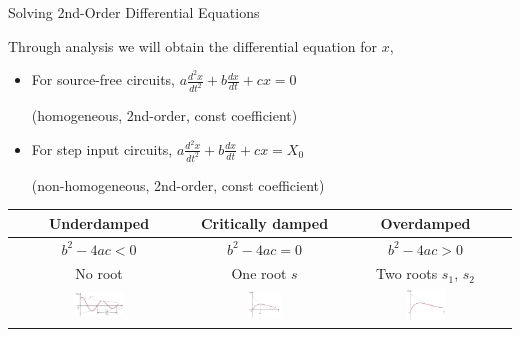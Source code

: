 \documentclass{beamer}
\begin{document}

\begin{frame}{Solving 2nd-Order Differential Equations}

Through analysis we will obtain the differential equation for $x$, 
\begin{itemize}
    \item For source-free circuits, $a\frac{d^2x}{dt^2}+b\frac{dx}{dt}+cx=0$

    (homogeneous, 2nd-order, const coefficient)
    \item For step input circuits, $a\frac{d^2x}{dt^2}+b\frac{dx}{dt}+cx=X_0$

    (non-homogeneous, 2nd-order, const coefficient)
\end{itemize}

\begin{table}[]
    \centering
    \begin{small}
           
    \begin{tabular}{ccc}
        \toprule
        Underdamped & Critically damped & Overdamped\\
        \midrule
        $b^2-4ac < 0$& $b^2-4ac=0$ & $b^2-4ac>0$ \\ 
        No root & One root $s$ & Two roots $s_1$, $s_2$ \\
        \includegraphics[width=0.3\textwidth]{img_2order/3_underdamped.png}
        &
        \includegraphics[width=0.25\textwidth]{img_2order/2_criticallydamped.png}
        &
        \includegraphics[width=0.25\textwidth]{img_2order/1_overdamped.png}
        \\
         \bottomrule
    \end{tabular}
    \end{small}
\end{table}

    
\end{frame}
\end{document}
